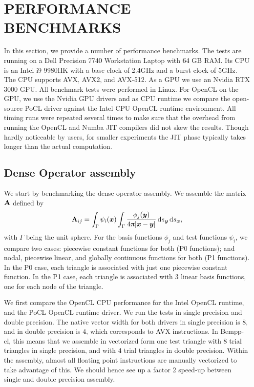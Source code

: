 \section{PERFORMANCE BENCHMARKS}

In this section, we provide a number of performance benchmarks. The tests are running on a Dell Precision 7740 Workstation Laptop with 64 GB RAM. Its CPU is an Intel i9-9980HK with a base clock of 2.4GHz and a burst clock of 5GHz. The CPU supports AVX, AVX2, and AVX-512.
As a GPU we use an Nvidia RTX 3000 GPU. All benchmark tests were performed in Linux. For OpenCL on the GPU, we use the Nvidia GPU drivers and as CPU runtime we compare the open-source PoCL driver against the Intel CPU OpenCL runtime environment. All timing runs were repeated several times to make sure that the overhead from running the OpenCL and Numba JIT compilers did not skew the results. Though hardly noticeable by users, for smaller experiments the JIT phase typically takes longer than the actual computation.

\subsection{Dense Operator assembly}
We start by benchmarking the dense operator assembly. We assemble the matrix $\mathbf{A}$ defined by
$$
\dmat{A}_{ij} = \int_{\Gamma}\psi_i(\bx)\int_{\Gamma}\frac{\phi_j(\by)}{4\uppi |\bx -\by|}\ds[\by]\ds[\bx],
$$
with $\Gamma$ being the unit sphere. For the basis functions $\phi_j$ and test functions $\psi_i$, we compare two cases: piecewise constant functions for both (P0 functions); and nodal, piecewise linear, and globally continuous functions for both (P1 functions). In the P0 case, each triangle is associated with just one piecewise constant function. In the P1 case, each triangle is associated with $3$ linear basis functions, one for each node of the triangle.

We first compare the OpenCL CPU performance for the Intel OpenCL runtime, and the PoCL OpenCL runtime driver. We run the tests in single precision and double precision. The native vector width for both drivers in single precision is $8$, and in double precision is $4$, which corresponds to AVX instructions. In Bempp-cl, this means that we assemble in vectorized form one test triangle with $8$ trial triangles in single precision, and with $4$ trial triangles in double precision. Within the assembly, almost all floating point instructions are manually vectorized to take advantage of this. We should hence see up a factor 2 speed-up between single and double precision assembly.

